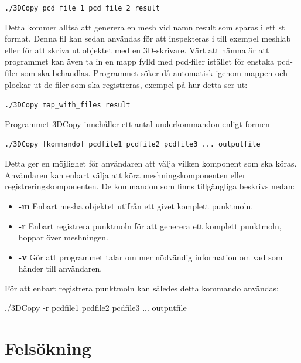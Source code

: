 \documentclass[a4paper,titlepage,12pt]{article}
\begin{document}
		\texttt{./3DCopy pcd\_file\_1 pcd\_file\_2 result}
		
		Detta kommer alltså att generera en mesh vid namn result som sparas i ett stl format. Denna fil kan sedan användas för att inspekteras i till exempel meshlab eller för att skriva ut objektet med en 3D-skrivare. Värt att nämna är att programmet kan även ta in en mapp fylld med pcd-filer istället för enstaka pcd-filer som ska behandlas. Programmet söker då automatisk igenom mappen och plockar ut de filer som ska registreras, exempel på hur detta ser ut:
		
		\texttt{./3DCopy map\_with\_files result}
		
		Programmet 3DCopy innehåller ett antal underkommandon enligt formen
		
		\texttt{./3DCopy [kommando] pcdfile1 pcdfile2 pcdfile3 ... outputfile}
		
		Detta ger en möjlighet för användaren att välja vilken komponent som ska köras. Användaren kan enbart välja att köra meshningskomponenten eller registreringskomponenten. De kommandon som finns tillgängliga beskrivs nedan:
		
		\begin{itemize}
			\item \textbf{-m} Enbart mesha objektet utifrån ett givet komplett punktmoln.
			\item \textbf{-r} Enbart registrera punktmoln för att generera ett komplett punktmoln, hoppar över meshningen.
			\item \textbf{-v} Gör att programmet talar om mer nödvändig information om vad som händer till användaren.
		\end{itemize}
		
		För att enbart registrera punktmoln kan således detta kommando användas:
		
		./3DCopy -r pcdfile1 pcdfile2 pcdfile3 ... outputfile
\newpage  
    
\section{Felsökning}
\newpage
    
%
%
\end{document}
